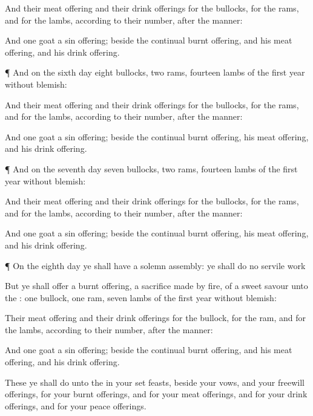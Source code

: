 {And their meat
offering and their drink
offerings for the
bullocks, for the
rams, and for the
lambs,
{} according to their
number, after the
manner:

And
one
goat
{} a sin
offering; beside the
continual burnt
offering, and his meat
offering, and his drink
offering.


\par }{\PP {}¶ And on the
sixth
day
eight
bullocks,
two
rams,
{}
fourteen
lambs of the
first
year without
blemish:

And their meat
offering and their drink
offerings for the
bullocks, for the
rams, and for the
lambs,
{} according to their
number, after the
manner:

And
one
goat
{} a sin
offering; beside the
continual burnt
offering, his meat
offering, and his drink
offering.


\par }{\PP {}¶ And on the
seventh
day
seven
bullocks,
two
rams,
{}
fourteen
lambs of the
first
year without
blemish:

And their meat
offering and their drink
offerings for the
bullocks, for the
rams, and for the
lambs,
{} according to their
number, after the
manner:

And
one
goat
{} a sin
offering; beside the
continual burnt
offering, his meat
offering, and his drink
offering.


\par }{\PP {}¶ On the
eighth
day ye shall have a solemn
assembly: ye shall
do no
servile
work
{}

But ye shall
offer a burnt
offering, a sacrifice made by
fire, of a
sweet
savour unto the
{}:
one
bullock,
one
ram,
seven
lambs of the
first
year without
blemish:

Their meat
offering and their drink
offerings for the
bullock, for the
ram, and for the
lambs,
{} according to their
number, after the
manner:

And
one
goat
{} a sin
offering; beside the
continual burnt
offering, and his meat
offering, and his drink
offering.

These
{} ye shall
do unto the
{} in your set
feasts, beside your
vows, and your freewill
offerings, for your burnt
offerings, and for your meat
offerings, and for your drink
offerings, and for your peace
offerings.

}
